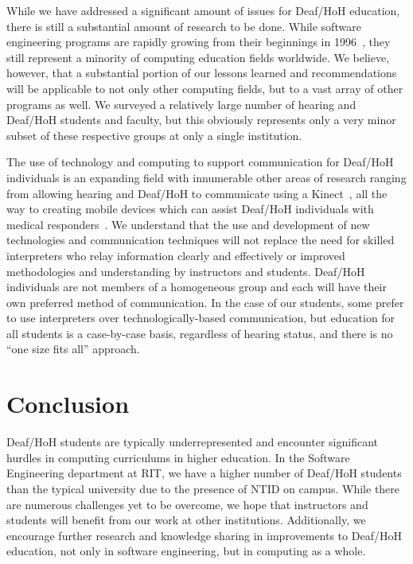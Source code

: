 \documentclass[conference]{IEEEtran}
\begin{document}
While we have addressed a significant amount of issues for Deaf/HoH education, there is still a substantial amount of research to be done. While software engineering programs are rapidly growing from their beginnings in 1996~\cite{lutz2012instilling}, they still represent a minority of computing education fields worldwide. We believe, however, that a substantial portion of our lessons learned and recommendations will be applicable to not only other computing fields, but to a vast array of other programs as well. We surveyed a relatively large number of hearing and Deaf/HoH students and faculty, but this obviously represents only a very minor subset of these respective groups at only a single institution.

The use of technology and computing to support communication for Deaf/HoH individuals is an expanding field with innumerable other areas of research ranging from allowing hearing and Deaf/HoH to communicate using a Kinect~\cite{Chai:2013:VTS:2513383.2513398}, all the way to creating mobile devices which can assist Deaf/HoH individuals with medical responders~\cite{Buttussi:2010:UMD:1851600.1851605}. We understand that the use and development of new technologies and communication techniques will not replace the need for skilled interpreters who relay information clearly and effectively or improved methodologies and understanding by instructors and students. Deaf/HoH individuals are not members of a homogeneous group and each will have their own preferred method of communication. In the case of our students, some prefer to use interpreters over technologically-based communication, but education for all students is a case-by-case basis, regardless of hearing status, and there is no ``one size fits all'' approach.





\section{Conclusion}
\label{sec: conclusion}
Deaf/HoH students are typically underrepresented and encounter significant hurdles in computing curriculums in higher education. In the Software Engineering department at RIT, we have a higher number of Deaf/HoH students than the typical university due to the presence of NTID on campus. While there are numerous challenges yet to be overcome, we hope that instructors and students will benefit from our work at other institutions. Additionally, we encourage further research and knowledge sharing in improvements to Deaf/HoH education, not only in software engineering, but in computing as a whole.




\IEEEpeerreviewmaketitle


\balance






\end{document}
